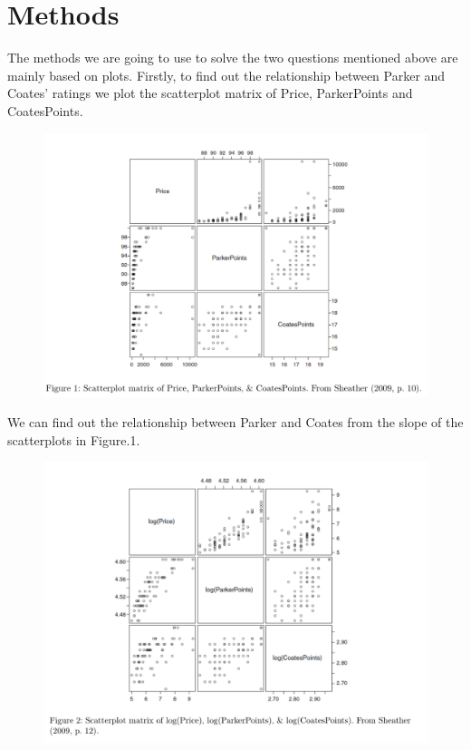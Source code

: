 \documentclass[11pt]{article}
\begin{document}
\section{Methods}
The methods we are going to use to solve the two questions mentioned above are mainly based on plots.
Firstly, to find out the relationship between Parker and Coates' ratings we plot the scatterplot matrix of Price, ParkerPoints and CoatesPoints.

\begin{figure}[h]
    \centering
    \includegraphics[width=15cm]{Fig01.jpg}
    \label{fig:galaxy}
\end{figure}
We can find out the relationship between Parker and Coates from the slope of the scatterplots in Figure.1.
\begin{figure}[h]
    \centering
    \includegraphics[width=15cm]{Fig02.jpg}
    \label{fig:galaxy}
\end{figure}
\end{document}
